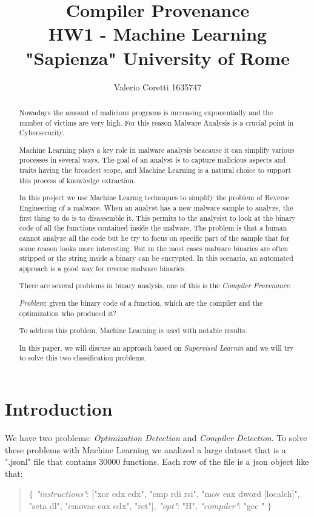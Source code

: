 \documentclass[12pt]{article}
\title{{\bf Compiler Provenance} \\ \bigskip \large HW1 - Machine Learning \\ \large "Sapienza" University of Rome}
\author{Valerio Coretti 1635747}
\begin{document}
\maketitle

\begin{abstract}

Nowadays the amount of malicious programs is increasing exponentially and the number of victims are very high. For this reason Malware Analysis is a crucial point in Cybersecurity.

Machine Learning plays a key role in malware analysis beacause it can simplify various processes in several ways. The goal of an analyst is to capture malicious aspects and traits having the broadest scope, and Machine Learning is a natural choice to support this process of knowledge extraction.

In this project we use Machine Learnig techniques to simplify the problem of Reverse Engineering of a malware. When an analyst has a new malware sample to analyze, the first thing to do is to disassemble it. This permits to the analysist to look at the binary code of all the functions contained inside the malware. The problem is that a human cannot analyze all the code but he try to focus on specific part of the sample that for some reason looks more interesting. But in the most cases malware binaries are often stripped or the string inside a binary can be encrypted. In this scenario, an automated approach is a good way for reverse malware binaries.

There are several problems in binary analysis, one of this is the {\em Compiler Provenance}.

{\em Problem}: given the binary code of a function, which are the compiler and the optimization who produced it?

To address this problem, Machine Learning is used with notable results.

In this paper, we will discuss an approach based on {\em Supervised Learnin} and we will try to solve this two classification problems.

\end{abstract}

\section{Introduction}
We have two problems: {\em Optimization Detection} and {\em Compiler Detection}.
To solve these problems with Machine Learning we analized a large dataset that is a ".jsonl" file that contains 30000 functions. Each row of the file is a json object like that:
\begin{quote}
$\{$
  \newline
  {\em "instructions"}: ["xor edx edx", "cmp rdi rsi", "mov eax dword [localch]", "seta dl", "cmovae eax edx", "ret"],
  \newline
  {\em "opt"}: "H",
  \newline
  {\em "compiler"}: "gcc "
  \newline
$\}$
\end{quote}
\end{document}
